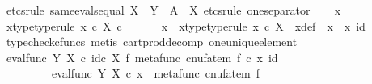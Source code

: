 \begin{isabellebody}
%
\isadelimproof
%
\endisadelimproof
%
\isatagproof
{}\isamarkupfalse%
\ {\isacharparenleft}{\kern0pt}etcs{\isacharunderscore}{\kern0pt}rule\ same{\isacharunderscore}{\kern0pt}evals{\isacharunderscore}{\kern0pt}equal{\isacharbrackleft}{\kern0pt}\ X\ {\isacharequal}{\kern0pt}\ Y{\isacharcomma}{\kern0pt}\ \ A\ {\isacharequal}{\kern0pt}\ X{\isacharbrackright}{\kern0pt}{\isacharcomma}{\kern0pt}\ etcs{\isacharunderscore}{\kern0pt}rule\ one{\isacharunderscore}{\kern0pt}separator{\isacharparenright}{\kern0pt}\isanewline
\ \ \isamarkupfalse%
\ x{}\isanewline
\ \ \isamarkupfalse%
\ x{}{\isacharunderscore}{\kern0pt}type{\isacharbrackleft}{\kern0pt}type{\isacharunderscore}{\kern0pt}rule{\isacharbrackright}{\kern0pt}{\isacharcolon}{\kern0pt}\ {\isachardoublequoteopen}x{}\ {\isasymin}\isactrlsub c\ X\ {\isasymtimes}\isactrlsub c\ {\isasymone}{\isachardoublequoteclose}\isanewline
\ \ \isamarkupfalse%
\ \isamarkupfalse%
\ x\ \ x{\isacharunderscore}{\kern0pt}type{\isacharbrackleft}{\kern0pt}type{\isacharunderscore}{\kern0pt}rule{\isacharbrackright}{\kern0pt}{\isacharcolon}{\kern0pt}\ {\isachardoublequoteopen}x\ {\isasymin}\isactrlsub c\ X{\isachardoublequoteclose}\ \ x{\isacharunderscore}{\kern0pt}def{\isacharcolon}{\kern0pt}\ {\isachardoublequoteopen}\ x{}\ {\isacharequal}{\kern0pt}\ {\isasymlangle}x{\isacharcomma}{\kern0pt}\ id\ {\isasymone}{\isasymrangle}{\isachardoublequoteclose}\isanewline
\ \ \ \ \isamarkupfalse%
\ {\isacharparenleft}{\kern0pt}typecheck{\isacharunderscore}{\kern0pt}cfuncs{\isacharcomma}{\kern0pt}\ metis\ cart{\isacharunderscore}{\kern0pt}prod{\isacharunderscore}{\kern0pt}decomp\ one{\isacharunderscore}{\kern0pt}unique{\isacharunderscore}{\kern0pt}element{\isacharparenright}{\kern0pt}\isanewline
\ \ \isamarkupfalse%
\ {\isachardoublequoteopen}{\isacharparenleft}{\kern0pt}eval{\isacharunderscore}{\kern0pt}func\ Y\ X\ {\isasymcirc}\isactrlsub c\ id\isactrlsub c\ X\ {\isasymtimes}\isactrlsub f\ metafunc\ {\isacharparenleft}{\kern0pt}cnufatem\ f{\isacharparenright}{\kern0pt}{\isacharparenright}{\kern0pt}\ {\isasymcirc}\isactrlsub c\ {\isasymlangle}x{\isacharcomma}{\kern0pt}\ id\ {\isasymone}{\isasymrangle}\ {\isacharequal}{\kern0pt}\isanewline
\ \ \ \ \ \ \ \ \ eval{\isacharunderscore}{\kern0pt}func\ Y\ X\ {\isasymcirc}\isactrlsub c\ {\isasymlangle}x\ {\isacharcomma}{\kern0pt}\ metafunc\ {\isacharparenleft}{\kern0pt}cnufatem\ f{\isacharparenright}{\kern0pt}{\isasymrangle}{\isachardoublequoteclose}\isanewline

\end{isabellebody}

